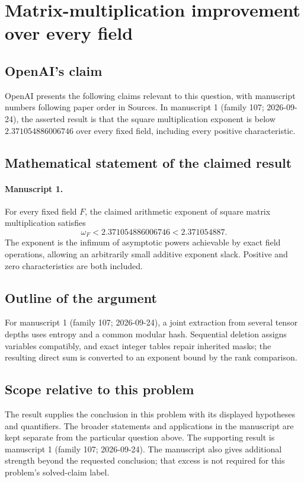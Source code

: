 \documentclass[11pt]{article}
\begin{document}
\section*{Matrix-multiplication improvement over every field}

\subsection{OpenAI's claim}
OpenAI presents the following claims relevant to this question, with manuscript numbers following paper order in Sources. In manuscript 1 (family 107; 2026-09-24), the asserted result is that the square multiplication exponent is below $2.371054886006746$ over every fixed field, including every positive characteristic.

\subsection{Mathematical statement of the claimed result}
\paragraph{Manuscript 1.}
For every fixed field $F$, the claimed arithmetic exponent of square matrix multiplication satisfies
\[
 \omega_F<2.371054886006746<2.371054887.
\]
The exponent is the infimum of asymptotic powers achievable by exact field operations, allowing an arbitrarily small additive exponent slack. Positive and zero characteristics are both included.

\subsection{Outline of the argument}
For manuscript 1 (family 107; 2026-09-24), a joint extraction from several tensor depths uses entropy and a common modular hash. Sequential deletion assigns variables compatibly, and exact integer tables repair inherited masks; the resulting direct sum is converted to an exponent bound by the rank comparison.

\subsection{Scope relative to this problem}
The result supplies the conclusion in this problem with its displayed hypotheses and quantifiers. The broader statements and applications in the manuscript are kept separate from the particular question above. The supporting result is manuscript 1 (family 107; 2026-09-24). The manuscript also gives additional strength beyond the requested conclusion; that excess is not required for this problem's solved-claim label.
\end{document}
